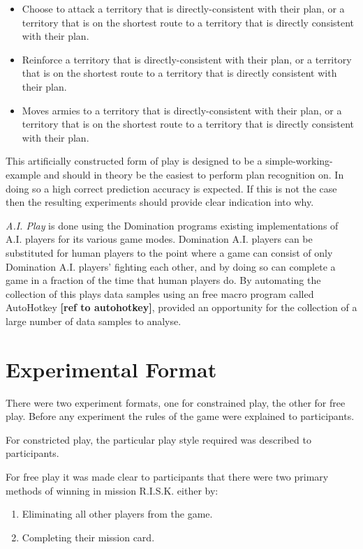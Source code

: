 \documentclass[parskip]{cs4rep}
\begin{document}
\begin{itemize}
\item
Choose to attack a territory that is directly-consistent with their plan, or a territory that is on the shortest route to a territory that is directly consistent with their plan.
\item
Reinforce a territory that is directly-consistent with their plan, or a territory that is on the shortest route to a territory that is directly consistent with their plan.
\item
Moves armies to a territory that is directly-consistent with their plan, or a territory that is on the shortest route to a territory that is directly consistent with their plan.
\end{itemize}

This artificially constructed form of play is designed to be a simple-working-example and should in theory be the easiest to perform plan recognition on. In doing so a high correct prediction accuracy is expected. If this is not the case then the resulting experiments should provide clear indication into why.

\textit{A.I. Play} is done using the Domination programs existing implementations of A.I. players for its various game modes. Domination A.I. players can be substituted for human players to the point where a game can consist of only Domination A.I. players' fighting each other, and by doing so can complete a game in a fraction of the time that human players do. By automating the collection of this plays data samples using an free macro program called AutoHotkey \textbf{[ref to autohotkey]}, provided an opportunity for the collection of a large number of data samples to analyse. 

\section{Experimental Format}

There were two experiment formats, one for constrained play, the other for free play. Before any experiment the rules of the game were explained to participants. 

For constricted play, the particular play style required was described to participants.

For free play it was made clear to participants that there were two primary methods of winning in mission R.I.S.K. either by:

\begin{enumerate}
\item
Eliminating all other players from the game.
\item
Completing their mission card.\newline
\end{enumerate}
\end{document}
